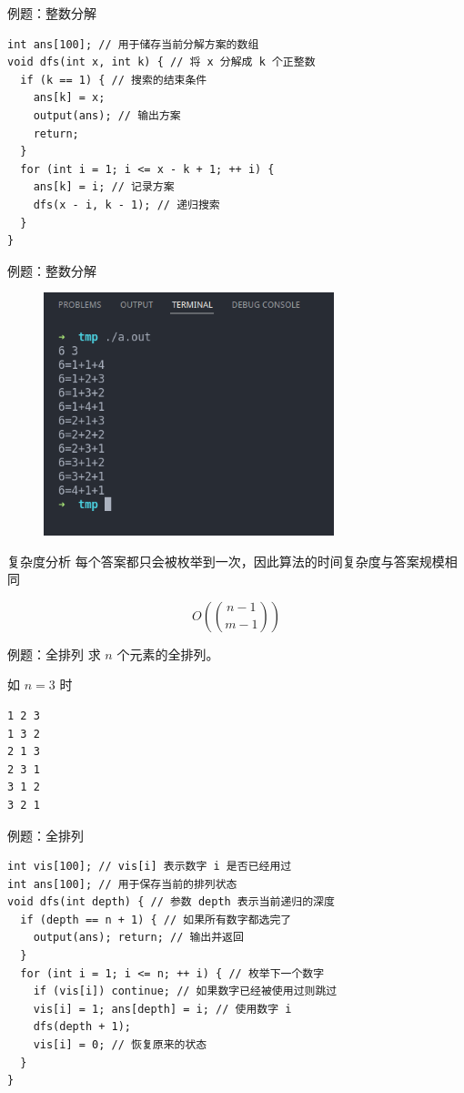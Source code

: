 \documentclass[12pt,aspectratio=169]{beamer}
\begin{document}
\begin{frame}[fragile]{例题：整数分解}
  \begin{verbatim}
int ans[100]; // 用于储存当前分解方案的数组
void dfs(int x, int k) { // 将 x 分解成 k 个正整数
  if (k == 1) { // 搜索的结束条件
    ans[k] = x;
    output(ans); // 输出方案
    return;
  }
  for (int i = 1; i <= x - k + 1; ++ i) {
    ans[k] = i; // 记录方案
    dfs(x - i, k - 1); // 递归搜索
  }
}
  \end{verbatim}
\end{frame}

\begin{frame}[fragile]{例题：整数分解}
  \begin{figure}
    \includegraphics[height=200pt]{example1.png}
  \end{figure}
\end{frame}

\begin{frame}[fragile]{复杂度分析}
  每个答案都只会被枚举到一次，因此算法的时间复杂度与答案规模相同\pause

  $$O({n-1 \choose m-1})$$
\end{frame}

\begin{frame}[fragile]{例题：全排列}
  求 $n$ 个元素的全排列。

  如 $n=3$ 时

  \begin{verbatim}
1 2 3
1 3 2
2 1 3
2 3 1
3 1 2
3 2 1
  \end{verbatim}
\end{frame}


\begin{frame}[fragile]{例题：全排列}
  \begin{verbatim}
int vis[100]; // vis[i] 表示数字 i 是否已经用过
int ans[100]; // 用于保存当前的排列状态
void dfs(int depth) { // 参数 depth 表示当前递归的深度
  if (depth == n + 1) { // 如果所有数字都选完了
    output(ans); return; // 输出并返回
  }
  for (int i = 1; i <= n; ++ i) { // 枚举下一个数字
    if (vis[i]) continue; // 如果数字已经被使用过则跳过
    vis[i] = 1; ans[depth] = i; // 使用数字 i
    dfs(depth + 1);
    vis[i] = 0; // 恢复原来的状态
  }
}
  \end{verbatim}
\end{frame}
\end{document}
